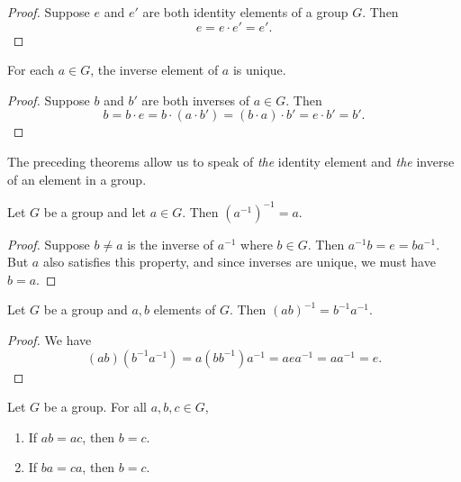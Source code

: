 \begin{proof}
    Suppose \(e\) and \(e'\) are both identity elements of a group \(G\). Then
    \[
        e = e \cdot e' = e'.
    \]
\end{proof}

\begin{theorem}
    For each \(a \in G\), the inverse element of \(a\) is unique.
\end{theorem}

\begin{proof}
    Suppose \(b\) and \(b'\) are both inverses of \(a \in G\). Then
    \[
        b = b \cdot e = b \cdot (a \cdot b') = (b \cdot a) \cdot b' = e \cdot b' = b'.
    \]
\end{proof}

\begin{remark}
    The preceding theorems allow us to speak of \emph{the} identity element and \emph{the} inverse of an element in a group.
\end{remark}

\begin{theorem}
    Let \(G\) be a group and let \(a \in G\). Then \((a^{-1})^{-1} = a\).
\end{theorem}

\begin{proof}
    Suppose \(b \neq a\) is the inverse of \(a^{-1}\) where \(b \in G\). Then \(a^{-1}b = e = ba^{-1}\). But \(a\) also satisfies this property, and since inverses are unique, we must have \(b = a\).
\end{proof}

\begin{theorem}
    Let \(G\) be a group and \(a, b\) elements of \(G\). Then \((ab)^{-1} = b^{-1}a^{-1}\).
\end{theorem}

\begin{proof}
    We have
    \[
        (ab)(b^{-1}a^{-1}) = a(bb^{-1})a^{-1} = aea^{-1} = aa^{-1} = e.
    \]
\end{proof}

\begin{theorem}
    Let \(G\) be a group. For all \(a, b, c \in G\),
    \begin{enumerate}
        \item If \(ab = ac\), then \(b = c\).
        \item If \(ba = ca\), then \(b = c\).
    \end{enumerate}
\end{theorem}

